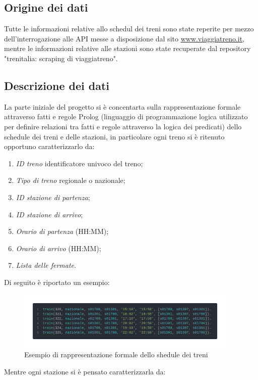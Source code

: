 \documentclass[italian,12pt,a4paper]{article}
\begin{document}
	\subsection{Origine dei dati}
	Tutte le informazioni relative allo schedul dei treni sono state reperite per mezzo dell'interrogazione alle API messe a disposizione dal sito \href{http://www.viaggiatreno.it/infomobilita/index.jsp}{www.viaggiatreno.it}, mentre le informazioni relative alle stazioni sono state recuperate dal repository "trenitalia: scraping di viaggiatreno".\cite{dati_stazioni}
	
	\subsection{Descrizione dei dati}
	La parte iniziale del progetto si è concentarta sulla rappresentazione formale attraverso fatti e regole Prolog (linguaggio di programmazione logica utilizzato per definire relazioni tra fatti e regole attraverso la logica dei predicati) dello schedule dei treni e delle stazioni, in particolare ogni treno si è ritenuto opportuno caratterizzarlo da:
	
		\begin{enumerate}
			\item \textit{ID treno} identificatore univoco del treno;
			\item \textit{Tipo di treno} regionale o nazionale;
			\item \textit{ID stazione di partenza};
			\item \textit{ID stazione di arrivo};
			\item\textit{Orario di partenza} (HH:MM);
			\item \textit{Orario di arrivo} (HH:MM);
			\item \textit{Lista delle fermate}.
		\end{enumerate} 
		\vspace{20px}
		Di seguito è riportato un esempio:
		
		\begin{figure}[!h]
			\centering
			\includegraphics[width=400px]{img/code_prolog1}
			\caption{Esempio di rappresentazione formale dello shedule dei treni}
		\end{figure}
		\newpage
	Mentre ogni stazione si è pensato caratterizzarla da:
	
\end{document}
